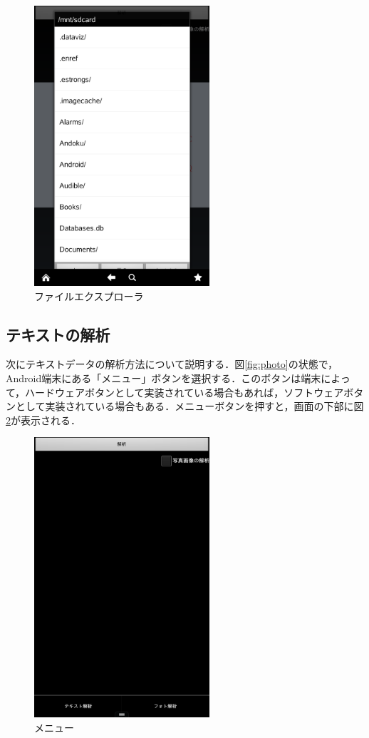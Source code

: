 \documentclass{jarticle}
\begin{document}
\begin{figure}[H]
\begin{center}
\includegraphics[width=65mm]{../play_store/file_select.png}
\caption{ファイルエクスプローラ}
\label{fig:file_select}
\end{center}
\end{figure}


\subsection{テキストの解析}
次にテキストデータの解析方法について説明する．図\ref{fig:photo}の状態で，Android端末にある「メニュー」ボタンを選択する．このボタンは端末によって，ハードウェアボタンとして実装されている場合もあれば，ソフトウェアボタンとして実装されている場合もある．メニューボタンを押すと，画面の下部に図\ref{fig:menu}が表示される．

\begin{figure}[H]
\begin{center}
\includegraphics[width=65mm]{../play_store/menu.png}
\caption{メニュー}
\label{fig:menu}
\end{center}
\end{figure}
\end{document}
